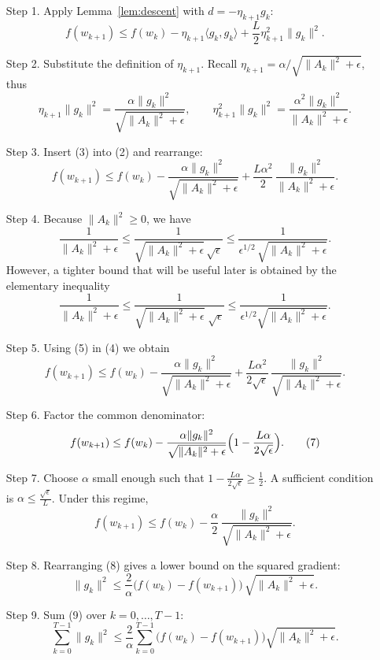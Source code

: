 \documentclass{article}
\begin{document}
\begin{enumerate}
\item[Step 1.] Apply Lemma~\ref{lem:descent} with $d=-\eta_{k+1}g_k$:
\[
f(w_{k+1})\le f(w_k)-\eta_{k+1}\langle g_k,g_k\rangle
+\frac{L}{2}\eta_{k+1}^{2}\|g_k\|^{2}.
\tag{2}
\]
\item[Step 2.] Substitute the definition of $\eta_{k+1}$.
Recall $\eta_{k+1}= \alpha/ \sqrt{\|A_k\|^{2}+\epsilon}$, thus
\[
\eta_{k+1}\|g_k\|^{2}
= \frac{\alpha\|g_k\|^{2}}{\sqrt{\|A_k\|^{2}+\epsilon}},
\qquad
\eta_{k+1}^{2}\|g_k\|^{2}
= \frac{\alpha^{2}\|g_k\|^{2}}{\|A_k\|^{2}+\epsilon}.
\tag{3}
\]
\item[Step 3.] Insert (3) into (2) and rearrange:
\[
f(w_{k+1})\le f(w_k)-\frac{\alpha\|g_k\|^{2}}
{\sqrt{\|A_k\|^{2}+\epsilon}}
+\frac{L\alpha^{2}}{2}\,
\frac{\|g_k\|^{2}}{\|A_k\|^{2}+\epsilon}.
\tag{4}
\]
\item[Step 4.] Because $\|A_k\|^{2}\ge 0$, we have
\[
\frac{1}{\|A_k\|^{2}+\epsilon}
\le \frac{1}{\sqrt{\|A_k\|^{2}+\epsilon}\,\sqrt{\epsilon}}
\le \frac{1}{\epsilon^{1/2}\,\sqrt{\|A_k\|^{2}+\epsilon}} .
\]
However, a tighter bound that will be useful later is obtained by
the elementary inequality
\[
\frac{1}{\|A_k\|^{2}+\epsilon}
\le \frac{1}{\sqrt{\|A_k\|^{2}+\epsilon}\;\sqrt{\epsilon}}
\le \frac{1}{\epsilon^{1/2}\sqrt{\|A_k\|^{2}+\epsilon}} .
\tag{5}
\]
\item[Step 5.] Using (5) in (4) we obtain
\[
f(w_{k+1})\le f(w_k)-\frac{\alpha\|g_k\|^{2}}
{\sqrt{\|A_k\|^{2}+\epsilon}}
+\frac{L\alpha^{2}}{2\sqrt{\epsilon}}\,
\frac{\|g_k\|^{2}}{\sqrt{\|A_k\|^{2}+\epsilon}} .
\tag{6}
\]
\item[Step 6.] Factor the common denominator:
\[
f(w_{k+1})\le f(w_k)-\frac{\alpha\|g_k\|^{2}}
{\sqrt{\|A_k\|^{2}+\epsilon}}
\Bigl(1-\frac{L\alpha}{2\sqrt{\epsilon}}\Bigr).
\tag{7}
\]
\item[Step 7.] Choose $\alpha$ small enough such that
$1-\frac{L\alpha}{2\sqrt{\epsilon}}\ge \frac12$.
A sufficient condition is $\alpha\le \frac{\sqrt{\epsilon}}{L}$.
Under this regime,
\[
f(w_{k+1})\le f(w_k)-\frac{\alpha}{2}\,
\frac{\|g_k\|^{2}}{\sqrt{\|A_k\|^{2}+\epsilon}} .
\tag{8}
\]
\item[Step 8.] Rearranging (8) gives a lower bound on the squared gradient:
\[
\|g_k\|^{2}\le
\frac{2}{\alpha}\bigl(f(w_k)-f(w_{k+1})\bigr)\,
\sqrt{\|A_k\|^{2}+\epsilon}.
\tag{9}
\]
\item[Step 9.] Sum (9) over $k=0,\dots,T-1$:
\[
\sum_{k=0}^{T-1}\|g_k\|^{2}
\le
\frac{2}{\alpha}\sum_{k=0}^{T-1}\bigl(f(w_k)-f(w_{k+1})\bigr)
\sqrt{\|A_k\|^{2}+\epsilon}.
\]
\end{enumerate}
\end{document}
